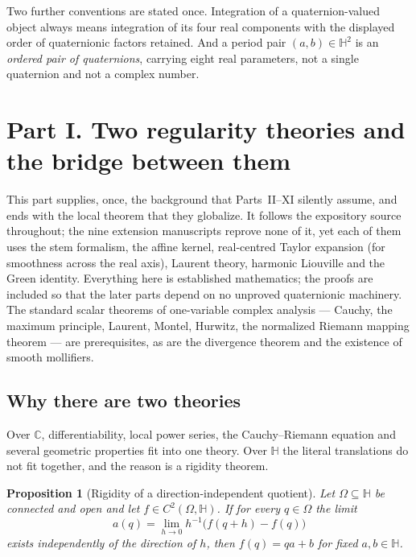 \documentclass[11pt,a4paper]{article}
\numberwithin{equation}{section}
\newtheorem{proposition}[theorem]{Proposition}
\theoremstyle{definition}
\theoremstyle{remark}
\theoremstyle{plain}
\newcommand{\HH}{\mathbb H}
\newcommand{\CC}{\mathbb C}
\newcommand{\Om}{\Omega}
\begin{document}
\medskip
Two further conventions are stated once. Integration of a quaternion-valued
object always means integration of its four real components with the displayed
order of quaternionic factors retained. And a period pair $(a,b)\in\HH^2$ is
an \emph{ordered pair of quaternions}, carrying eight real parameters, not a
single quaternion and not a complex number.


\section{Part I. Two regularity theories and the bridge between them}
\label{a:sec:two-theories}

This part supplies, once, the background that Parts~II--XI silently assume,
and ends with the local theorem that they globalize. It follows the
expository source throughout; the nine extension manuscripts reprove none of
it, yet each of them uses the stem formalism, the affine kernel, real-centred
Taylor expansion (for smoothness across the real axis), Laurent theory,
harmonic Liouville and the Green identity. Everything here is established
mathematics; the proofs are included so that the later parts depend on no
unproved quaternionic machinery. The standard scalar theorems of one-variable
complex analysis --- Cauchy, the maximum principle, Laurent, Montel, Hurwitz,
the normalized Riemann mapping theorem --- are prerequisites, as are the
divergence theorem and the existence of smooth mollifiers.

\subsection{Why there are two theories}
\label{a:sec:why-two}

Over $\CC$, differentiability, local power series, the Cauchy--Riemann
equation and several geometric properties fit into one theory. Over $\HH$ the
literal translations do not fit together, and the reason is a rigidity
theorem.

\begin{proposition}[Rigidity of a direction-independent quotient]
\label{a:prop:rigidity}
Let $\Om\subseteq\HH$ be connected and open and let $f\in C^2(\Om,\HH)$.
If for every $q\in\Om$ the limit
\[
 a(q)=\lim_{h\to0}h^{-1}\bigl(f(q+h)-f(q)\bigr)
\]
exists independently of the direction of $h$, then $f(q)=qa+b$ for fixed
$a,b\in\HH$.
\end{proposition}
\end{document}
